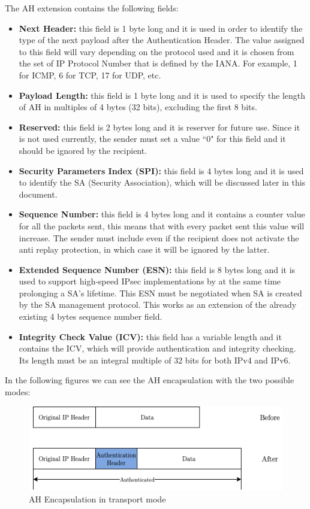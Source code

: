 \documentclass[11pt]{book}
\begin{document}
The AH extension contains the following fields:
\begin{itemize}
\item \textbf{Next Header:} this field is 1 byte long and it is used in order to identify the type of the next payload after the Authentication Header. The value assigned to this field will vary depending on the protocol used and it is chosen from the set of IP Protocol Number that is defined by the IANA. For example, 1 for ICMP, 6 for TCP, 17 for UDP, etc. 
\item \textbf{Payload Length:} this field is 1 byte long and it is used to specify the length of AH in multiples of 4 bytes (32 bits), excluding the first 8 bits.
\item \textbf{Reserved:} this field is 2 bytes long and it is reserver for future use. Since it is not used currently, the sender must set a value ``0" for this field and it should be ignored by the recipient. 
\item \textbf{Security Parameters Index (SPI):} this field is 4 bytes long and it is used to identify the SA (Security Association), which will be discussed later in this document. 
\item \textbf{Sequence Number:} this field is 4 bytes long and it contains a counter value for all the packets sent, this means that with every packet sent this value will increase. The sender must include even if the recipient does not activate the anti replay protection, in which case it will be ignored by the latter.
\item \textbf{Extended Sequence Number (ESN):} this field is 8 bytes long and it is used to support high-speed IPsec implementations by at the same time prolonging a SA's lifetime. This ESN must be negotiated when SA is created by the SA management protocol. This works as an extension of the already existing 4 bytes sequence number field.
\item \textbf{Integrity Check Value (ICV):} this field has a variable length and it contains the ICV, which will provide authentication and integrity checking. Its length must be an integral multiple of 32 bits for both IPv4 and IPv6. 
\end{itemize}
In the following figures we can see the AH encapsulation with the two possible modes:
\begin{figure}[H]
	\centering
	\includegraphics [scale=0.6] {ah-transport.png}
	\caption{AH Encapsulation in transport mode}
\end{figure}
\end{document}
